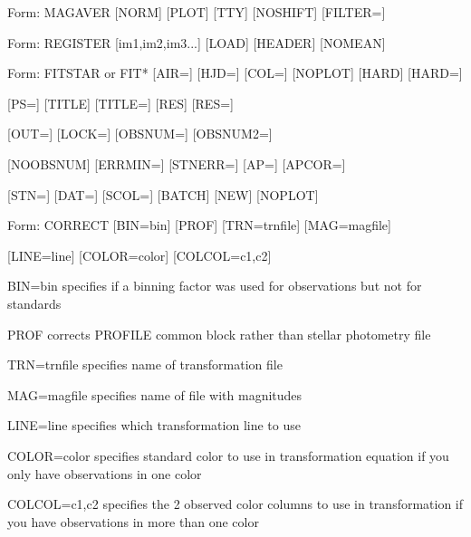 {\newpage\clearpage
{}%
\begin{command}
  \item[Form: MAGAVER {[NORM]} {[PLOT]} {[TTY]} {[NOSHIFT]} {[FILTER=]}\hfill]{}
\end{command}%
\lthtmlfigureZ
\lthtmlcheckvsize\clearpage}

{\newpage\clearpage
{}%
\begin{command}
  \item[Form: REGISTER {[im1,im2,im3...]} {[LOAD]} {[HEADER]} {[NOMEAN]}\hfill]{}
\end{command}%
\lthtmlfigureZ
\lthtmlcheckvsize\clearpage}

{\newpage\clearpage
{}%
\begin{command}
  \item[Form: FITSTAR or FIT* {[AIR=]} {[HJD=]} {[COL=]} {[NOPLOT]} {[HARD]} {[HARD=]}\hfill]{}
  \item{{[PS=]} {[TITLE]} {[TITLE=]} {[RES]} {[RES=]} }
  \item{{[OUT=]} {[LOCK=]} {[OBSNUM=]} {[OBSNUM2=]}}
  \item{{[NOOBSNUM]} {[ERRMIN=]} {[STNERR=]} {[AP=]} {[APCOR=]}}
  \item{{[STN=]} {[DAT=]} {[SCOL=]} {[BATCH]} {[NEW]} {[NOPLOT]} }
\end{command}%
\lthtmlfigureZ
\lthtmlcheckvsize\clearpage}

{\newpage\clearpage
{}%
\begin{command}
  \item[Form: CORRECT  {[BIN=bin]} {[PROF]} {[TRN=trnfile]} {[MAG=magfile]}\hfill]{}
  \item{{[LINE=line]} {[COLOR=color]} {[COLCOL=c1,c2]}}
  \item[BIN=bin]{specifies if a binning factor was used
for observations but not for standards}
  \item[PROF]{corrects PROFILE common block rather than stellar photometry file}
  \item[TRN=trnfile]{specifies name of transformation file}
  \item[MAG=magfile]{ specifies name of file with magnitudes}
  \item[LINE=line ]{specifies which transformation line to use}
  \item[COLOR=color]{specifies standard color to use in
transformation equation if you only have observations in one color}
  \item[COLCOL=c1,c2  ]{  specifies the 2 observed color columns to 
use in transformation if you have observations in more than one color}
\end{command}%
\lthtmlfigureZ
\lthtmlcheckvsize\clearpage}

